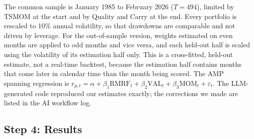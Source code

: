 \documentclass[11pt]{article}
\begin{document}
The common sample is January 1985 to February 2026 ($T=494$), limited by TSMOM at the start
and by Quality and Carry at the end. Every portfolio is rescaled to 10\% annual volatility,
so that drawdowns are comparable and not driven by leverage. For the out-of-sample version,
weights estimated on even months are applied to odd months and vice versa, and each
held-out half is scaled using the volatility of its estimation half only. This is a
cross-fitted, held-out estimate, not a real-time backtest, because the estimation half
contains months that come later in calendar time than the month being scored. The AMP
spanning regression is $r_{p,t}=\alpha+\beta_1\text{RMRF}_t+\beta_2\text{VAL}_t+\beta_3\text{MOM}_t+\varepsilon_t$.
The LLM-generated code reproduced our estimates exactly; the corrections we made are listed
in the AI workflow log.

\subsection*{Step 4: Results}

\begin{table}[H]
\centering\small
\caption{Capstone results, all portfolios scaled to 10\% annual volatility. Sharpe ratios are
annualized. OOS uses the even/odd-month cross-fit. Maximum drawdown is for the OOS series,
with peak, trough and recovery months. AMP alpha in \% per year with Newey--West (6 lags)
$t$-statistics in parentheses; OLS $t$-statistics are 2.33, 1.98, 5.29 (IS) and 2.23, 1.97,
1.89 (OOS).}
\label{tab:cap}
\end{table}
\end{document}
